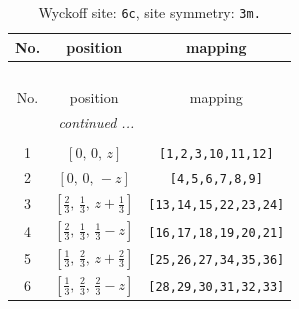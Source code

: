 \documentclass[fleqn,8pt]{jsarticle}
\begin{document}
\renewcommand{\arraystretch}{1.2}
\begin{longtable}{ccc}
\caption{Wyckoff site: {\tt 6c}, site symmetry: {\tt 3m.}}
 \\
 \hline \hline
No. & position & mapping \\ \hline \endfirsthead

\multicolumn{2}{l}{\tablename\ \thetable{}} \\
 \hline \hline
No. & position & mapping \\ \hline \endhead

 \hline \hline
\multicolumn{2}{r}{\footnotesize\it continued ...} \\ \endfoot

 \hline \hline
\multicolumn{2}{r}{} \\ \endlastfoot

1 & $\left[ 0,\, 0,\, z \right]$ & {\tt [1,2,3,10,11,12]} \\ \hline
2 & $\left[ 0,\, 0,\, - z \right]$ & {\tt [4,5,6,7,8,9]} \\ \hline
3 & $\left[ \frac{2}{3},\, \frac{1}{3},\, z + \frac{1}{3} \right]$ & {\tt [13,14,15,22,23,24]} \\ \hline
4 & $\left[ \frac{2}{3},\, \frac{1}{3},\, \frac{1}{3} - z \right]$ & {\tt [16,17,18,19,20,21]} \\ \hline
5 & $\left[ \frac{1}{3},\, \frac{2}{3},\, z + \frac{2}{3} \right]$ & {\tt [25,26,27,34,35,36]} \\ \hline
6 & $\left[ \frac{1}{3},\, \frac{2}{3},\, \frac{2}{3} - z \right]$ & {\tt [28,29,30,31,32,33]} \\
\end{longtable}
\renewcommand{\arraystretch}{1.2}
\end{document}
